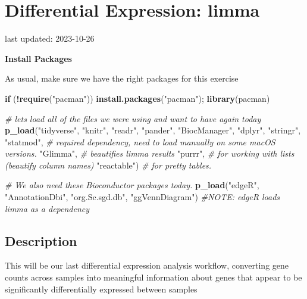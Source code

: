\documentclass[
]{book}
\newenvironment{Shaded}{\begin{snugshade}}{\end{snugshade}}
\newcommand{\CommentTok}[1]{\textcolor[rgb]{0.56,0.35,0.01}{\textit{#1}}}
\newcommand{\ControlFlowTok}[1]{\textcolor[rgb]{0.13,0.29,0.53}{\textbf{#1}}}
\newcommand{\FunctionTok}[1]{\textcolor[rgb]{0.13,0.29,0.53}{\textbf{#1}}}
\newcommand{\NormalTok}[1]{#1}
\newcommand{\SpecialCharTok}[1]{\textcolor[rgb]{0.81,0.36,0.00}{\textbf{#1}}}
\newcommand{\StringTok}[1]{\textcolor[rgb]{0.31,0.60,0.02}{#1}}
\begin{document}
\hypertarget{differential-expression-limma}{%
\chapter{Differential Expression: limma}\label{differential-expression-limma}}

last updated: 2023-10-26

\textbf{Install Packages}

As usual, make sure we have the right packages for this exercise

\begin{Shaded}
\begin{Highlighting}[]
\ControlFlowTok{if}\NormalTok{ (}\SpecialCharTok{!}\FunctionTok{require}\NormalTok{(}\StringTok{"pacman"}\NormalTok{)) }\FunctionTok{install.packages}\NormalTok{(}\StringTok{"pacman"}\NormalTok{); }\FunctionTok{library}\NormalTok{(pacman)}

\CommentTok{\# let\textquotesingle{}s load all of the files we were using and want to have again today}
\FunctionTok{p\_load}\NormalTok{(}\StringTok{"tidyverse"}\NormalTok{, }\StringTok{"knitr"}\NormalTok{, }\StringTok{"readr"}\NormalTok{,}
       \StringTok{"pander"}\NormalTok{, }\StringTok{"BiocManager"}\NormalTok{, }
       \StringTok{"dplyr"}\NormalTok{, }\StringTok{"stringr"}\NormalTok{, }
       \StringTok{"statmod"}\NormalTok{, }\CommentTok{\# required dependency, need to load manually on some macOS versions.}
       \StringTok{"Glimma"}\NormalTok{, }\CommentTok{\# beautifies limma results}
       \StringTok{"purrr"}\NormalTok{, }\CommentTok{\# for working with lists (beautify column names)}
       \StringTok{"reactable"}\NormalTok{) }\CommentTok{\# for pretty tables.}

\CommentTok{\# We also need these Bioconductor packages today.}
\FunctionTok{p\_load}\NormalTok{(}\StringTok{"edgeR"}\NormalTok{, }\StringTok{"AnnotationDbi"}\NormalTok{, }\StringTok{"org.Sc.sgd.db"}\NormalTok{, }\StringTok{"ggVennDiagram"}\NormalTok{)}
\CommentTok{\#NOTE: edgeR loads limma as a dependency}
\end{Highlighting}
\end{Shaded}

\hypertarget{description-4}{%
\section{Description}\label{description-4}}

This will be our last differential expression analysis workflow,
converting gene counts across samples into meaningful information about
genes that appear to be significantly differentially expressed between
samples
\end{document}
